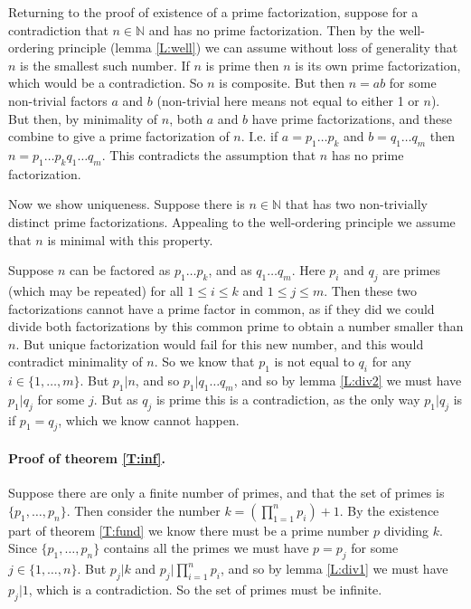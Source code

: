 \documentclass{article}
\theoremstyle{plain}
\newcommand{\bN}{\mathbb{N}}
\begin{document}
Returning to the proof of existence of a prime factorization, suppose for a contradiction that $n\in \bN$ and has no prime factorization. Then by the well-ordering principle (lemma \ref{L:well}) we can assume without loss of generality that $n$ is the smallest such number. If $n$ is prime then $n$ is its own prime factorization, which would be a contradiction. So $n$ is composite. But then $n=ab$ for some non-trivial factors $a$ and $b$ (non-trivial here means not equal to either 1 or $n$). But then, by minimality of $n$, both $a$ and $b$ have prime factorizations, and these combine to give a prime factorization of $n$. I.e. if $a=p_1\ldots p_k$ and $b= q_1\ldots q_m$ then $n=p_1\ldots p_kq_1\ldots q_m$. This contradicts the assumption that $n$ has no prime factorization.

Now we show uniqueness. Suppose there is $n\in\bN$ that has two non-trivially distinct prime factorizations. Appealing to the well-ordering principle we assume that $n$ is minimal with this property. 

Suppose $n$ can be factored as $p_1\ldots p_k$, and as $q_1\ldots q_m$. Here $p_i$ and $q_j$ are primes (which may be repeated) for all $1\leq i\leq k$ and $1\leq j\leq m$. Then these two factorizations cannot have a prime factor in common, as if they did we could divide both factorizations by this common prime to obtain a number smaller than $n$. But unique factorization would fail for this new number, and this would contradict minimality of $n$. So we know that $p_1$ is not equal to $q_i$ for any $i\in\{1,\ldots,m\}$. But $p_1|n$, and so $p_1|q_1\ldots q_m$, and so by lemma \ref{L:div2} we must have $p_1|q_j$ for some $j$. But as $q_j$ is prime this is a contradiction, as the only way $p_1| q_j$ is if $p_1= q_j$, which we know cannot happen. 

\paragraph{Proof of theorem \ref{T:inf}.} Suppose there are only a finite number of primes, and that the set of primes is $\{p_1,\ldots,p_n\}$. Then consider the number $k=(\prod_{1=1}^n p_i) +1$. By the existence part of theorem \ref{T:fund} we know there must be a prime number $p$ dividing $k$. Since $\{p_1,\ldots,p_n\}$ contains all the primes we must have $p=p_j$ for some $j\in\{1,\ldots,n\}$. But $p_j|k$ and $p_j|\prod_{i=1}^n p_i$, and so by lemma \ref{L:div1} we must have $p_j|1$, which is a contradiction. So the set of primes must be infinite.
\end{document}
